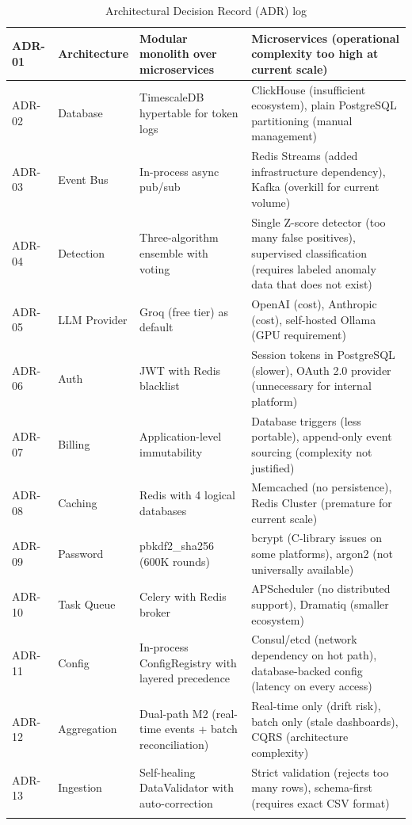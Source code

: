 \documentclass[12pt,a4paper,twoside]{report}
\begin{document}
\begin{longtable}{|l|l|X|X|}
ADR-01 & Architecture & Modular monolith over microservices & Microservices (operational complexity too high at current scale) \\
\hline
ADR-02 & Database & TimescaleDB hypertable for token logs & ClickHouse (insufficient ecosystem), plain PostgreSQL partitioning (manual management) \\
\hline
ADR-03 & Event Bus & In-process async pub/sub & Redis Streams (added infrastructure dependency), Kafka (overkill for current volume) \\
\hline
ADR-04 & Detection & Three-algorithm ensemble with voting & Single Z-score detector (too many false positives), supervised classification (requires labeled anomaly data that does not exist) \\
\hline
ADR-05 & LLM Provider & Groq (free tier) as default & OpenAI (cost), Anthropic (cost), self-hosted Ollama (GPU requirement) \\
\hline
ADR-06 & Auth & JWT with Redis blacklist & Session tokens in PostgreSQL (slower), OAuth 2.0 provider (unnecessary for internal platform) \\
\hline
ADR-07 & Billing & Application-level immutability & Database triggers (less portable), append-only event sourcing (complexity not justified) \\
\hline
ADR-08 & Caching & Redis with 4 logical databases & Memcached (no persistence), Redis Cluster (premature for current scale) \\
\hline
ADR-09 & Password & pbkdf2\_sha256 (600K rounds) & bcrypt (C-library issues on some platforms), argon2 (not universally available) \\
\hline
ADR-10 & Task Queue & Celery with Redis broker & APScheduler (no distributed support), Dramatiq (smaller ecosystem) \\
\hline
ADR-11 & Config & In-process ConfigRegistry with layered precedence & Consul/etcd (network dependency on hot path), database-backed config (latency on every access) \\
\hline
ADR-12 & Aggregation & Dual-path M2 (real-time events + batch reconciliation) & Real-time only (drift risk), batch only (stale dashboards), CQRS (architecture complexity) \\
\hline
ADR-13 & Ingestion & Self-healing DataValidator with auto-correction & Strict validation (rejects too many rows), schema-first (requires exact CSV format) \\
\hline

\caption{Architectural Decision Record (ADR) log}
\label{tab:adr}
\end{longtable}
\end{document}
